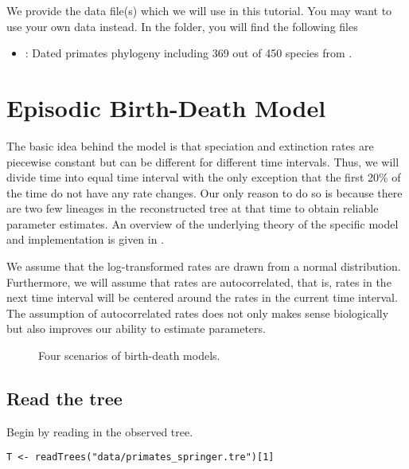 We provide the data file(s) which we will use in this tutorial.
You may want to use your own data instead.
In the  folder, you will find the following files
\begin{itemize}
\item {}: Dated primates phylogeny including 369 out of 450 species from \cite{Springer2012}.
\end{itemize}




\bigskip
\section{Episodic Birth-Death Model}

The basic idea behind the model is that speciation and extinction rates are piecewise constant but can be different for different time intervals.
Thus, we will divide time into equal time interval with the only exception that the first 20\% of the time do not have any rate changes.
Our only reason to do so is because there are two few lineages in the reconstructed tree at that time to obtain reliable parameter estimates.
An overview of the underlying theory of the specific model and implementation is given in \citep{Hoehna2015a}.

We assume that the log-transformed rates are drawn from a normal distribution.
Furthermore, we will assume that rates are autocorrelated, that is, rates in the next time interval will be centered around the rates in the current time interval.
The assumption of autocorrelated rates does not only makes sense biologically but also improves our ability to estimate parameters.
\begin{figure}[h!]
\centering
{}
\caption{\small Four scenarios of birth-death models.}
\label{fig:EBD}
\end{figure}



\subsection{Read the tree}

Begin by reading in the observed tree. 

{\tt \begin{snugshade*}
\begin{lstlisting}
T <- readTrees("data/primates_springer.tre")[1]
\end{lstlisting}
\end{snugshade*}}

